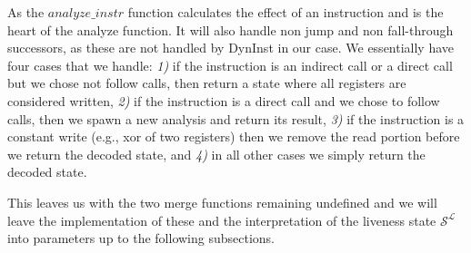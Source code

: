
As the $analyze\_instr$ function calculates the effect of an instruction and is the heart of the analyze function. It will also handle non jump 
and non fall-through successors, as these are not handled by DynInst in our case. We essentially have four cases that we handle:
\textit{1)} if the instruction is an indirect call or a direct call but we chose not follow calls, then return a state where all registers are considered written, 
\textit{2)} if the instruction is a direct call and we chose to follow calls, then we spawn a new analysis and return its result,
\textit{3)} if the instruction is a constant write (e.g., xor of two registers) then we remove the read portion before we return the decoded state, and 
\textit{4)} in all other cases we simply return the decoded state.

This leaves us with the two merge functions remaining undefined and we will leave the implementation of these and the interpretation of the  liveness state $\mathcal{S}^\mathcal{L}$ into parameters up to the following subsections.

